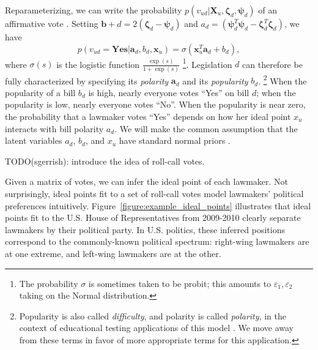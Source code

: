 Reparameterizing, we can write the probability $p(v_{ud} | \bm X_u, \bm \zeta_d,
 \bm \psi_d)$ of an affirmative vote
 \cite{clinton:2004}.  Setting $\bm b+d = 2 (\bm \zeta_d
 - \bm \psi_d )$ and $a_d = (\bm \psi_d^T \bm \psi_d - \bm \zeta_d^T
 \bm \zeta_d )$, we have
\begin{equation}
  p(v_{ud} = \textbf{Yes} | \bm a_d, b_d, \bm x_u) = \sigma ( \bm x_u^T \bm a_d + b_d ),
  \label{equation:trad_ipm}
\end{equation}
where $\sigma(s)$ is the logistic function $\frac{\exp(s)}{1 +
  \exp(s)}$ \footnote{The probability $\sigma$ is sometimes taken to
  be probit; this amounts to $\varepsilon_1, \varepsilon_2$ taking on
  the Normal distribution.}.  Legislation $d$ can therefore be fully
characterized by specifying its \emph{polarity} $\bm a_d$ and its
\emph{popularity} $b_d$. \footnote{Popularity is also called
  \emph{difficulty}, and polarity is called \emph{polarity}, in the
  context of educational testing applications of this model
  \cite{clinton:2004}.  We move away from these terms in favor of more
  appropriate terms for this application.}  When the popularity of a
bill $b_d$ is high, nearly everyone votes ``Yes'' on bill $d$; when
the popularity is low, nearly everyone votes ``No''.  When the
popularity is near zero, the probability that a lawmaker votes ``Yes''
depends on how her ideal point $x_u$ interacts with bill polarity
$a_d$.  We will make the common assumption that the latent variables
$a_d$, $b_d$, and $x_u$ have standard normal priors
\cite{clinton:2004}.

TODO(sgerrish): introduce the idea of roll-call votes.

Given a matrix of votes, we can infer the ideal point of each
lawmaker.  Not surprisingly, ideal points fit to a set of roll-call
votes model lawmakers' political preferences intuitively.  
Figure~\ref{figure:example_ideal_points} illustrates that ideal points
fit to the U.S. House of Representatives from 2009-2010 clearly
separate lawmakers by their political party.  In U.S. politics, these
inferred positions correspond to the commonly-known political
spectrum: right-wing lawmakers are at one extreme, and left-wing
lawmakers are at the other. %




